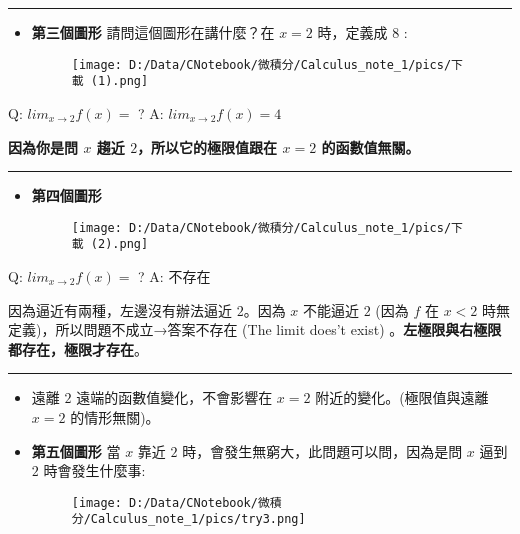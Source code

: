\documentclass[]{article}
\begin{document}
\begin{center}\rule{0.5\linewidth}{\linethickness}\end{center}

\begin{itemize}
\item
  \textbf{第三個圖形} 請問這個圖形在講什麼？在 \(x=2\) 時，定義成 \(8\)
  :

  \begin{figure}
  \centering
  \texttt{[image: D:/Data/CNotebook/微積分/Calculus\_note\_1/pics/下載 (1).png]}
  \caption{}
  \end{figure}
\end{itemize}

Q: \(lim _{x\rightarrow  {2}}f(x)= \) ? A:
\(lim _{x\rightarrow  {2}}f(x)= 4\)

\textbf{因為你是問 \(x\) 趨近 \(2\)，所以它的極限值跟在 \(x=2\)
的函數值無關。}

\begin{center}\rule{0.5\linewidth}{\linethickness}\end{center}

\begin{itemize}
\item
  \textbf{第四個圖形}

  \begin{figure}
  \centering
  \texttt{[image: D:/Data/CNotebook/微積分/Calculus\_note\_1/pics/下載 (2).png]}
  \caption{}
  \end{figure}
\end{itemize}

Q: \(lim _{x\rightarrow  {2}}f(x)= \) ? A: 不存在

因為逼近有兩種，左邊沒有辦法逼近 \(2\)。因為 \(x\) 不能逼近 \(2\) (因為
\(f\) 在 \(x<2\) 時無定義)，所以問題不成立→答案不存在 (The limit does't
exist) 。\textbf{左極限與右極限都存在，極限才存在}。

\begin{center}\rule{0.5\linewidth}{\linethickness}\end{center}

\begin{itemize}
\item
  遠離 \(2\) 遠端的函數值變化，不會影響在 \(x=2\)
  附近的變化。(極限值與遠離 \(x=2\) 的情形無關)。
\item
  \textbf{第五個圖形} 當 \(x\) 靠近 \(2\)
  時，會發生無窮大，此問題可以問，因為是問 \(x\) 逼到 \(2\)
  時會發生什麼事:

  \begin{figure}
  \centering
  \texttt{[image: D:/Data/CNotebook/微積分/Calculus\_note\_1/pics/try3.png]}
  \caption{}
  \end{figure}
\end{itemize}
\end{document}
